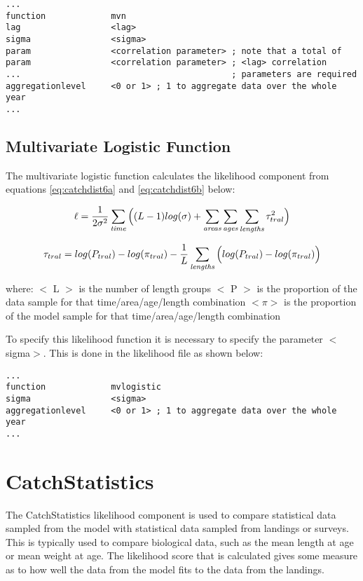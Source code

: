 \documentclass [a4paper, 10pt]{book}
\begin{document}
{\small\begin{verbatim}
...
function             mvn
lag                  <lag>
sigma                <sigma>
param                <correlation parameter> ; note that a total of
param                <correlation parameter> ; <lag> correlation
...                                          ; parameters are required
aggregationlevel     <0 or 1> ; 1 to aggregate data over the whole year
...
\end{verbatim}}

\newpage %
\subsection{Multivariate Logistic Function}
The multivariate logistic function calculates the likelihood component from equations \ref{eq:catchdist6a} and \ref{eq:catchdist6b} below:

\begin{equation}\label{eq:catchdist6a}
\ell = \frac{1}{2\sigma^2} \sum_{\it time} \Big((L - 1) log(\sigma)+\sum_{\it areas}\sum_{\it ages}\sum_{\it lengths} \tau_{tral}^2 \Big)
\end{equation}

\begin{equation}\label{eq:catchdist6b}
\tau_{tral} = log(P_{tral}) - log(\pi_{tral}) - \frac{1}{L}\sum_{\it lengths} \Big(log(P_{tral}) - log(\pi_{tral}) \Big)
\end{equation}

where:\newline
$<$ L $>$ is the number of length groups\newline
$<$ P $>$ is the proportion of the data sample for that time/area/age/length combination\newline
$<\pi>$ is the proportion of the model sample for that time/area/age/length combination

\bigskip
To specify this likelihood function it is necessary to specify the parameter $<$sigma$>$. This is done in the likelihood file as shown below:

{\small\begin{verbatim}
...
function             mvlogistic
sigma                <sigma>
aggregationlevel     <0 or 1> ; 1 to aggregate data over the whole year
...
\end{verbatim}}

\section{CatchStatistics}\label{sec:catchstat}
The CatchStatistics likelihood component is used to compare statistical data sampled from the model with statistical data sampled from landings or surveys.  This is typically used to compare biological data, such as the mean length at age or mean weight at age.  The likelihood score that is calculated gives some measure as to how well the data from the model fits to the data from the landings.
\end{document}
